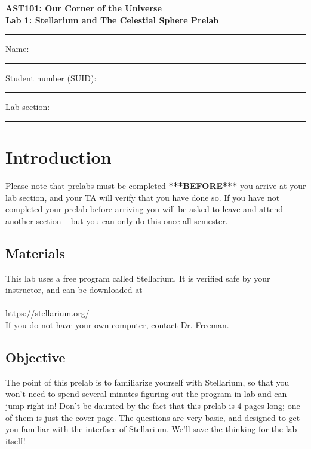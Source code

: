 \documentclass[11pt]{article}
\begin{document}
\begin{center}
\textbf{\Large
AST101: Our Corner of the Universe \\
\vspace*{0.1cm}
Lab 1: Stellarium and The Celestial Sphere Prelab
}
\end{center}

\vspace*{0.5cm}

\hrule
{\Large Name:}\vspace*{0.5cm}\\\hrule
{\Large Student number (SUID):}\vspace*{0.5cm}\\\hrule
{\Large Lab section:}\vspace*{0.5cm}\\\hrule
\vspace*{0.5cm}

\section{Introduction}

Please note that prelabs must be completed \underline{\textbf{***BEFORE***}} you arrive at your lab section, and your TA will verify that you have done so. If you have not completed your prelab before arriving you will be asked to leave and attend another section
-- but you can only do this once all semester.

\subsection*{Materials}

This lab uses a free program called Stellarium. It is verified safe by your instructor, and can be downloaded at  \\
\\
\url{https://stellarium.org/} \\

If you do not have your own computer, contact Dr. Freeman.

\subsection*{Objective}

The point of this prelab is to familiarize yourself with Stellarium, so that you won't need to spend several minutes figuring out the program in lab and can jump right in! Don't be daunted by the fact that this prelab is 4 pages long; one of them is just the cover page. The questions are very basic, and designed to get you familiar with the interface of Stellarium. We'll save the thinking for the lab itself!
\end{document}
